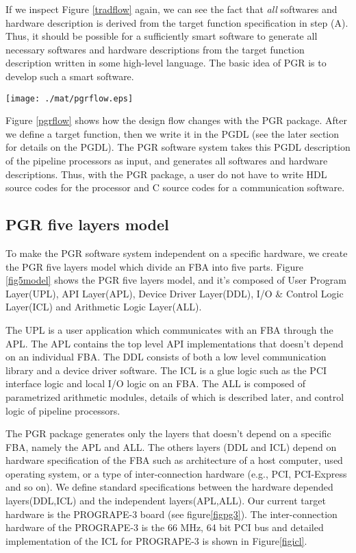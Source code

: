 \documentclass[times, 10pt,twocolumn]{article}
\begin{document}
If we inspect  Figure \ref{tradflow} again, we can see the fact that {\it
all} softwares and hardware description is derived from the target
function specification in step (A). Thus, it should be possible for a
sufficiently smart software to generate all necessary softwares and
hardware descriptions from the target function description written in
some high-level language. The basic idea of PGR is to develop such
a smart software.

\begin{figure*}[htb]
\begin{center}
\texttt{[image: ./mat/pgrflow.eps]}
\caption{How the design flow changes with PGR.}
\label{pgrflow}
\end{center}
\end{figure*}

Figure \ref{pgrflow} shows how the design flow changes with the PGR package.
After we define a target function, then we write it in the PGDL
(see the later section for details on the PGDL).
The PGR software system takes this PGDL description of the pipeline processors
as input, and generates all softwares and hardware descriptions.
Thus, with the PGR package, a user do not have to write HDL source codes for
the processor and C source codes for a communication software.

\subsection{PGR five layers model}
To make the PGR software system independent on a specific hardware,
we create the PGR five layers model which divide 
an FBA into five parts.
Figure \ref{fig5model} shows the PGR five layers model, 
and it's composed of User Program Layer(UPL), API Layer(APL),
Device Driver Layer(DDL), I/O \& Control Logic Layer(ICL) and
Arithmetic Logic Layer(ALL).

The UPL is a user application which communicates
with an FBA through the APL.
The APL contains the top level API implementations that
doesn't depend on an individual FBA.
The DDL consists of both a low level communication library and a device driver software. 
The ICL is a glue logic such as the PCI interface logic and 
local I/O logic on an FBA.
The ALL is composed of parametrized arithmetic modules,
details of which is described later, 
and control logic of pipeline processors.

The PGR package generates only the layers that doesn't depend on 
a specific FBA, namely the APL and ALL.
The others layers (DDL and ICL) depend on hardware specification
of the FBA such as architecture of a host computer, used operating
system, or a type of inter-connection hardware (e.g., PCI, PCI-Express and so on).
We define standard specifications between the hardware depended layers(DDL,ICL)
and the independent layers(APL,ALL).
Our current target hardware is the PROGRAPE-3 board (see figure\ref{figpg3}).
The inter-connection hardware of the PROGRAPE-3 is the 66 MHz, 64 bit PCI bus
and detailed implementation of the ICL for PROGRAPE-3
is shown in Figure\ref{figicl}.
\end{document}
